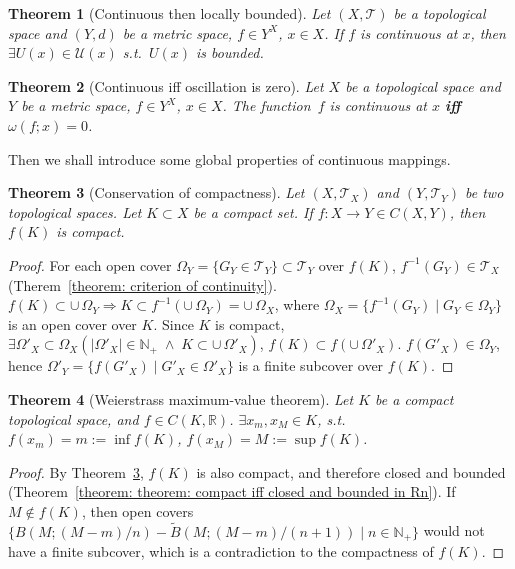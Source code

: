 \documentclass[openany]{book}
\theoremstyle{plain}
\newtheorem{theorem}{Theorem}[section] %
\theoremstyle{definition}
\newcommand{\emphbf}[1]{\emph{\textbf{#1}}}
\begin{document}
\begin{theorem}[Continuous then locally bounded]
	Let $(X, \mathscr T)$ be a topological space and $(Y, d)$ be a metric space, $f \in Y^X$, $x \in X$. 
	If $f$ is continuous at $x$, then $\exists U(x) \in \mathscr U(x)$ s.t.\ $U(x)$ is bounded.
\end{theorem}

\begin{theorem}[Continuous iff oscillation is zero]
		\label{theorem: continuous iff oscillation is zero}
	Let $X$ be a topological space and $Y$ be a metric space, $f \in Y^X$, $x \in X$. 
	The function~$f$ is continuous at $x$ \emphbf{iff} $\omega(f; x) = 0$. 	
\end{theorem}

Then we shall introduce some global properties of continuous mappings.

\begin{theorem}[Conservation of compactness]
		\label{theorem: conservation of compactness}
	Let $(X, \mathscr T_X)$ and $(Y, \mathscr T_Y)$ be two topological spaces. 
	Let $K \subset X$ be a compact set. 
	If $f \colon X \to Y \in C(X, Y)$, then $f(K)$ is compact.
\end{theorem}
\begin{proof}
	For each open cover $\Omega_Y = \{ G_Y \in \mathscr T_Y\} \subset \mathscr T_Y$ over $f( K)$, $f^{-1} ( G_Y) \in \mathscr T_X$ (Therem~\ref{theorem: criterion of continuity}). $f( K) \subset \cup\,\Omega_Y \Rightarrow K \subset f^{-1} \left(  \cup\,\Omega_Y \right) = \cup\,\Omega_X $, where $\Omega_X = \{ f^{-1} ( G_Y) \mid G_Y \in \Omega_Y\} $ is an open cover over $K$. Since $K$ is compact,
	$\exists \Omega'_X \subset \Omega_X\left( 
	\lvert \Omega'_X \rvert \in \mathbb{N}_+ 
	\;\wedge\;K\subset \cup\,\Omega'_X
	\right)$, $f( K) \subset f ( \cup\,\Omega'_X) $. $f ( G'_X) \in \Omega_Y$, hence $\Omega'_Y = \{ f ( G'_X) \mid G'_X \in \Omega'_X\}$ is a finite subcover over $f( K)$.
\end{proof}


\begin{theorem}[Weierstrass maximum-value theorem]
	\label{theorem: Weierstrass maximum-value}
	Let $K$ be a compact topological space, and $f \in C (K, \mathbb R)$.
	$\exists x_m, x_M \in K$, s.t.\ $f(x_m) = m := \inf f(K)$, $f(x_M) = M := \sup f(K)$.
\end{theorem}
\begin{proof}
	By Theorem~\ref{theorem: conservation of compactness}, $f(K)$ is also compact, and therefore closed and bounded (Theorem~\ref{theorem: theorem: compact iff closed and bounded in Rn}). 
	If $M \notin f(K)$, then open covers $\{ B(M; (M-m)/n) - \tilde B(M; (M-m)/(n + 1)) \mid  n \in \mathbb N_+\} $ would not have a finite subcover, which is a contradiction to the compactness of $f(K)$.
\end{proof}
\end{document}
